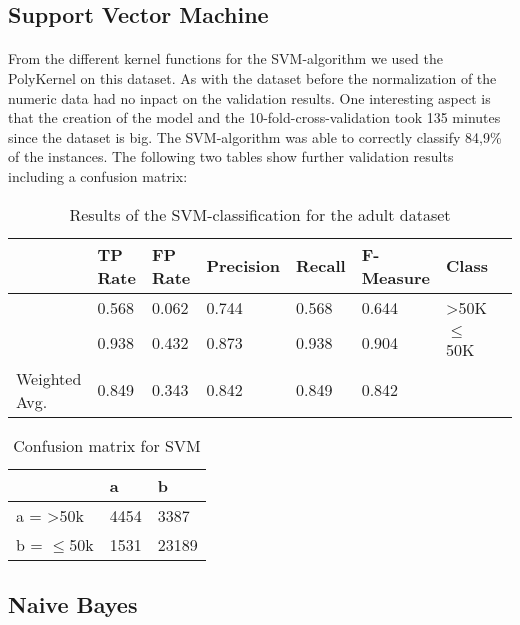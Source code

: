 \documentclass[paper=a4, fontsize=11pt]{scrartcl} %
\numberwithin{equation}{section} %
\numberwithin{figure}{section} %
\numberwithin{table}{section} %
\begin{document}
\subsection{Support Vector Machine}

\paragraph{}From the different kernel functions for the SVM-algorithm we used the PolyKernel on this dataset. As with the dataset before the normalization of the numeric data had no inpact on the validation results. One interesting aspect is that the creation of the model and the 10-fold-cross-validation took 135 minutes since the dataset is big. The SVM-algorithm was able to correctly classify 84,9\% of the instances. The following two tables show further validation results including a confusion matrix:

\begin{table}[h]
\centering
\begin{tabular}{llllllll}
	\toprule
									&TP Rate   	&FP Rate   &Precision   &Recall  &F-Measure  	&Class\\
	\midrule
									&0.568     	&0.062     &0.744     	&0.568   &0.644    	    	&	>50K\\
  								&0.938     	&0.432     &0.873     	&0.938   &0.904         	&$\leq$50K\\
  
	Weighted Avg.   & 0.849    & 0.343     &0.842   		&0.849   &0.842     			&\\
	\bottomrule
\end{tabular}
\caption{Results of the SVM-classification for the adult dataset}
\end{table}

\vspace{6pt}

\begin{table}[h]
\centering
\begin{tabular}{|l|ll|}
\hline
              &    a &     b \\
\hline
 a = >50k      & 4454 &  3387 \\
 b = $\leq$50k & 1531 & 23189\\
\hline
\end{tabular}
\caption{Confusion matrix for SVM}
\end{table}


\subsection{Naive Bayes}
\end{document}
